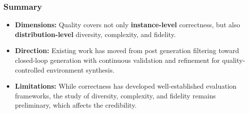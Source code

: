 \subsubsection{Summary}
\begin{tcolorbox}[takeaway,title={Takeaway 5.3}]
\begin{itemize}
\item \textbf{Dimensions:} Quality covers not only \textbf{instance-level} correctness, but also \textbf{distribution-level} diversity, complexity, and fidelity.

\item \textbf{Direction:} Existing work has moved from post generation filtering toward closed-loop generation with continuous validation and refinement for quality-controlled environment synthesis.

\item \textbf{Limitations:} While correctness has developed well-established evaluation frameworks, the study of diversity, complexity, and fidelity remains preliminary, which affects the credibility.
\end{itemize}
\end{tcolorbox}